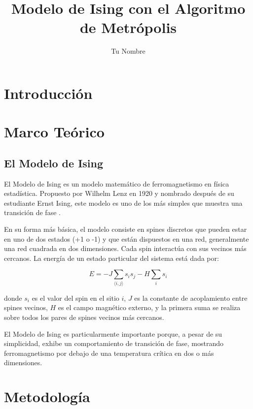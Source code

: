 \documentclass[twocolumn]{article}
\title{Modelo de Ising con el Algoritmo de Metrópolis}
\author{Tu Nombre}
\date{}
\begin{document}
\maketitle

\begin{abstract}
\end{abstract}

\section{Introducción}

\section{Marco Teórico}
\subsection*{El Modelo de Ising}

El Modelo de Ising es un modelo matemático de ferromagnetismo en física estadística. Propuesto por Wilhelm Lenz en 1920 y nombrado después de su estudiante Ernst Ising, este modelo es uno de los más simples que muestra una transición de fase \cite{isingwiki}.

En su forma más básica, el modelo consiste en spines discretos que pueden estar en uno de dos estados (+1 o -1) y que están dispuestos en una red, generalmente una red cuadrada en dos dimensiones. Cada spin interactúa con sus vecinos más cercanos. La energía de un estado particular del sistema está dada por:

\begin{equation}
    E = -J \sum_{\langle i,j \rangle} s_i s_j - H \sum_i s_i
\end{equation}

donde $s_i$ es el valor del spin en el sitio $i$, $J$ es la constante de acoplamiento entre spines vecinos, $H$ es el campo magnético externo, y la primera suma se realiza sobre todos los pares de spines vecinos más cercanos.

El Modelo de Ising es particularmente importante porque, a pesar de su simplicidad, exhibe un comportamiento de transición de fase, mostrando ferromagnetismo por debajo de una temperatura crítica en dos o más dimensiones.

\section{Metodología}
\end{document}
